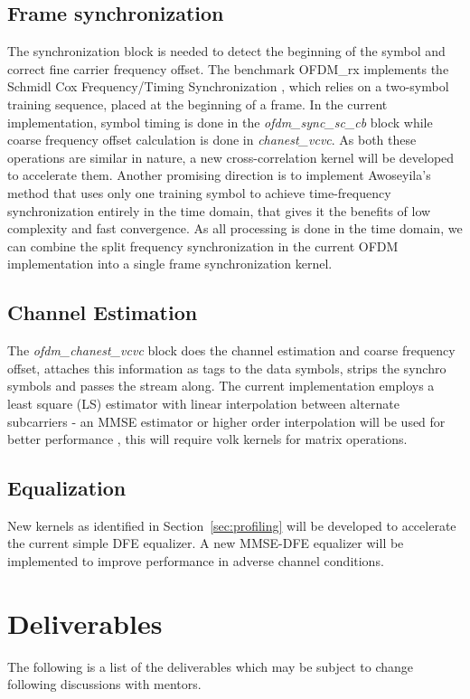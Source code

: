 \documentclass[a4paper,12pt,oneside]{article}
\begin{document}
\subsection{Frame synchronization}
The synchronization block is needed to detect the beginning of the symbol and correct fine carrier frequency offset. The benchmark OFDM\_rx implements the Schmidl Cox Frequency/Timing Synchronization \cite{schmidl-cox}, which relies on a two-symbol training sequence, placed at the beginning of a frame. In the current implementation, symbol timing is done in the {\it ofdm\_sync\_sc\_cb} block while coarse frequency offset calculation is done in {\it chanest\_vcvc}. As both these operations are similar in nature, a new cross-correlation kernel will be developed to accelerate them.
Another promising direction is to implement Awoseyila's method \cite{awoseyila} that uses only one training symbol to achieve time-frequency synchronization entirely in the time domain, that gives it the benefits of low complexity and fast convergence. As all processing is done in the time domain, we can combine the split frequency synchronization in the current OFDM implementation into a single frame synchronization kernel. 
  
\subsection{Channel Estimation}
The {\it ofdm\_chanest\_vcvc} block does the channel estimation and coarse frequency offset, attaches this information as tags to the data symbols, strips the synchro symbols and passes the stream along. The current implementation employs a least square (LS) estimator with linear interpolation between alternate subcarriers - an MMSE estimator or higher order interpolation will be used for better performance \cite{channel-estimator}, this will require volk kernels for matrix operations. 

\subsection{Equalization}
New kernels as identified in Section~\ref{sec:profiling} will be developed to accelerate the current simple DFE equalizer. A new MMSE-DFE equalizer \cite{mmse-equalizer} will be implemented to improve performance in adverse channel conditions.

\section{Deliverables}
The following is a list of the deliverables which may be subject to change following discussions with mentors. 
\end{document}
